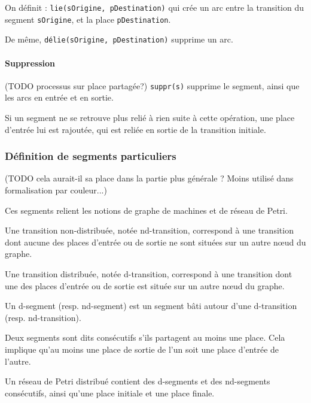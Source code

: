On définit : \texttt{lie(sOrigine, pDestination)} qui crée un arc entre la transition du segment \texttt{sOrigine}, et la place \texttt{pDestination}.

De même, \texttt{délie(sOrigine, pDestination)} supprime un arc.

\paragraph{Suppression}
(TODO processus sur place partagée?)
\texttt{suppr(s)} supprime le segment, ainsi que les arcs en entrée et en sortie.

Si un segment ne se retrouve plus relié à rien suite à cette opération, une place d'entrée lui est rajoutée, qui est reliée en sortie de la transition initiale.

\subsubsection{Définition de segments particuliers}
(TODO cela aurait-il sa place dans la partie plus générale ? Moins utilisé dans formalisation par couleur...)

Ces segments relient les notions de graphe de machines et de réseau de Petri.
\begin{mydef}
Une transition non-distribuée, notée nd-transition, correspond à une transition dont aucune des places d'entrée ou de sortie ne sont situées sur un autre nœud du graphe.
\end{mydef}

\begin{mydef}
Une transition distribuée, notée d-transition, correspond à une transition dont une des places d'entrée ou de sortie est située sur un autre nœud du graphe.
\end{mydef}

\begin{mydef}
Un d-segment (resp. nd-segment) est un segment bâti autour d'une d-transition (resp. nd-transition).
\end{mydef}

\begin{mydef}
Deux segments sont dits consécutifs s'ils partagent au moins une place. Cela implique qu'au moins une place de sortie de l'un soit une place d'entrée de l'autre.
\end{mydef}

Un réseau de Petri distribué contient des d-segments et des nd-segments consécutifs, ainsi qu'une place initiale et une place finale.

